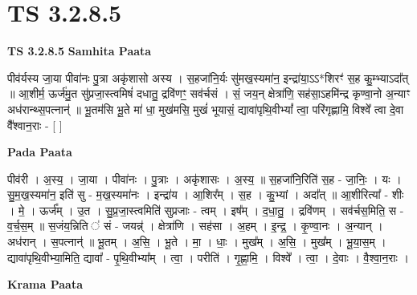 \documentclass[17pt]{extarticle}
\begin{document}

\section{ TS 3.2.8.5 }

\textbf{TS 3.2.8.5 } \newline
\textbf{Samhita Paata} \newline

पीव॑र्यस्य जा॒या पीवा॑नः पु॒त्रा अकृ॑शासो अस्य । स॒हजा॑नि॒र्यः सु॑मख॒स्यमा॑न॒ इन्द्रा॑या॒ऽऽ*शिरꣳ॑ स॒ह कु॒म्भ्याऽदा᳚त् ॥ आ॒शीर्म॒ ऊर्ज॑मु॒त सु॑प्रजा॒स्त्वमिषं॑ दधातु॒ द्रवि॑णꣳ॒॒ सव॑र्चसं । सं॒ जय॒न् क्षेत्रा॑णि॒ सह॑सा॒ऽहमि॑न्द्र कृण्वा॒नो अ॒न्याꣳ अध॑रान्थ्स॒पत्नान्॑ ॥ भू॒तम॑सि भू॒ते मा॑ धा॒ मुख॑मसि॒ मुखं॑ भूयासं॒ द्यावा॑पृथि॒वीभ्यां᳚ त्वा॒ परि॑गृह्णामि॒ विश्वे᳚ त्वा दे॒वा वै᳚श्वान॒राः - [  ] \newline

\textbf{Pada Paata} \newline

पीव॑री । अ॒स्य॒ । जा॒या । पीवा॑नः । पु॒त्राः । अकृ॑शासः । अ॒स्य॒ ॥ स॒हजा॑नि॒रिति॑ स॒ह - जा॒निः॒ । यः । सु॒म॒ख॒स्यमा॑न॒ इति॑ सु - म॒ख॒स्यमा॑नः । इन्द्रा॑य । आ॒शिर᳚म् । स॒ह । कु॒भ्यां । अदा᳚त् ॥ आ॒शीरित्या᳚ - शीः । मे॒ । ऊर्ज᳚म् । उ॒त । सु॒प्र॒जा॒स्त्वमिति॑ सुप्रजाः - त्वम् । इष᳚म् । द॒धा॒तु॒ । द्रवि॑णम् । सव॑र्चस॒मिति॒ स - व॒र्च॒स॒म् ॥ स॒जंय॒न्निति ॑ सं - जयन्न्॑ । क्षेत्रा॑णि । सह॑सा । अ॒हम् । इ॒न्द्र॒ । कृ॒ण्वा॒नः । अ॒न्यान् । अध॑रान् । स॒पत्नान्॑ ॥ भू॒तम् । अ॒सि॒ । भू॒ते । मा॒ । धाः॒ । मुख᳚म् । अ॒सि॒ । मुख᳚म् । भू॒या॒स॒म् । द्यावा॑पृथि॒वीभ्या॒मिति॒ द्यावा᳚ - पृ॒थि॒वीभ्या᳚म् । त्वा॒ । परीति॑ । गृ॒ह्णा॒मि॒ । विश्वे᳚ । त्वा॒ । दे॒वाः । वै॒श्वा॒न॒राः ।  \newline


\textbf{Krama Paata} \newline
\end{document}
